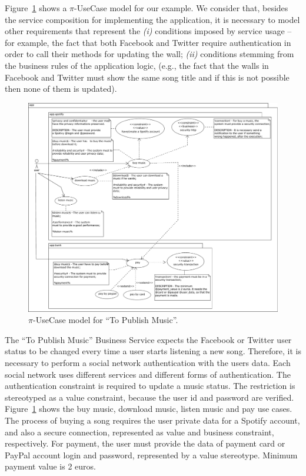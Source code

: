 \documentclass{singlecol-new}
\theoremstyle{TH}{
\newtheorem{lemma}{Lemma}
\newtheorem{theorem}[lemma]{Theorem}
\newtheorem{corrolary}[lemma]{Corrolary}
\newtheorem{conjecture}[lemma]{Conjecture}
\newtheorem{proposition}[lemma]{Proposition}
\newtheorem{claim}[lemma]{Claim}
\newtheorem{stheorem}[lemma]{Wrong Theorem}
\newtheorem{algorithm}{Algorithm}
}
\theoremstyle{THrm}{
\newtheorem{definition}{Definition}[section]
\newtheorem{question}{Question}[section]
\newtheorem{remark}{Remark}
\newtheorem{scheme}{Scheme}
}
\theoremstyle{THhit}{
\newtheorem{case}{Case}[section]
}
\theoremstyle{THhsl}{
\newtheorem{example}{Example}
}
\begin{document}
\begin{example}\label{ex:toPublicMusic2}
Figure~\ref{fig:CIM:piusecasetpm} shows a $\pi$-UseCase model for our example.
We consider that, besides the service composition for implementing the application, it is necessary to model  other requirements that represent the \textit{(i)} conditions imposed by service usage -- for example, the fact that both Facebook and Twitter require authentication in order to call their methods for updating the wall; \textit{(ii)}  conditions stemming from the business rules of the application logic, (e.g., the fact that the walls in Facebook and Twitter must show the same song title and if this is not possible then none of them is updated).

\begin{figure}[h]
\center
\includegraphics[width=1\textwidth]{./figures/UseCase.pdf}
\caption{\label{fig:CIM:piusecasetpm} $\pi$-UseCase model for ``To Publish Music''.}
\end{figure}

The ``To Publish Music'' Business Service expects  the Facebook or Twitter user status to be changed every time a user starts listening a new song.
Therefore, it is necessary to perform a social network authentication with the users data. Each social network uses different services and different forms of authentication. The authentication constraint is required to update a music status. 
The restriction is stereotyped as a value constraint, because the user id and password are verified.  
Figure~\ref{fig:CIM:piusecasetpm} shows the buy music, download music, listen music and pay use cases. 
The process of buying a song requires the user private data for a Spotify account, and also a secure connection, represented as value and business constraint, respectively. 
For payment, the user must provide the data of payment card or PayPal account login and password, represented by a value stereotype.
Minimum payment value is 2 euros.
\end{example}
\end{document}

